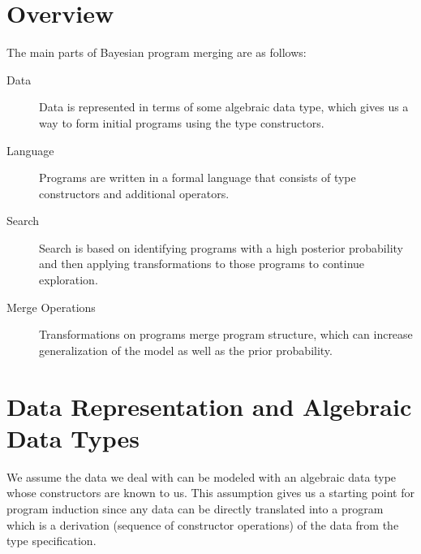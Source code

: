 \documentclass[a4paper,10pt]{article}
\begin{document}
\section{Overview}
The main parts of Bayesian program merging are as follows:
\begin{description}
\item[Data] Data is represented in terms of some algebraic data type, which gives us a way to form initial programs using the type constructors.
\item[Language] Programs are written in a formal language that consists of type constructors and additional operators.
\item[Search] Search is based on identifying programs with a high posterior probability and then applying transformations to those programs to continue exploration.
\item[Merge Operations] Transformations on programs merge program structure, which can increase generalization of the model as well as the prior probability.
\end{description}
\section{Data Representation and Algebraic Data Types}
We assume the data we deal with can be modeled with an algebraic data type whose constructors are known to us.  This assumption gives us a starting point for program induction since any data can be directly translated into a program which is a derivation (sequence of constructor operations) of the data from the type specification. 
\end{document}
